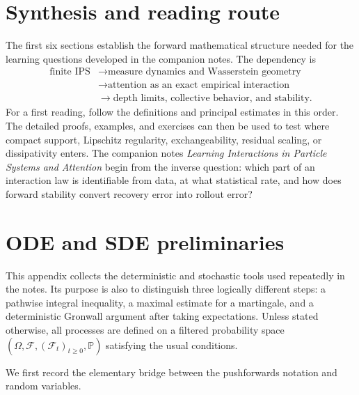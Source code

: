 \documentclass[11pt]{amsart}
\numberwithin{equation}{section}
\theoremstyle{plain}
\newcommand{\Prob}{\mathbb{P}}
\begin{document}
\section*{Synthesis and reading route}
The first six sections establish the forward mathematical structure needed for
the learning questions developed in the companion notes.  The dependency is
\[
\begin{aligned}
 \text{finite IPS}
 &\longrightarrow \text{measure dynamics and Wasserstein geometry}\\
 &\longrightarrow \text{attention as an exact empirical interaction}\\
 &\longrightarrow \text{depth limits, collective behavior, and stability}.
\end{aligned}
\]
For a first reading, follow the definitions and principal estimates in this
order.  The detailed proofs, examples, and exercises can then be used to test
where compact support, Lipschitz regularity, exchangeability, residual
scaling, or dissipativity enters.  The companion notes \emph{Learning
Interactions in Particle Systems and Attention} begin from the inverse
question: which part of an interaction law is identifiable from data, at what
statistical rate, and how does forward stability convert recovery error into
rollout error?

\appendix
\section{ODE and SDE preliminaries}
\label{sec:ode-sde-preliminaries}
This appendix collects the deterministic and stochastic tools used repeatedly
in the notes.  Its purpose is also to distinguish three logically different
steps: a pathwise integral inequality, a maximal estimate for a martingale,
and a deterministic Gronwall argument after taking expectations.  Unless
stated otherwise, all processes are defined on a filtered probability space
$(\Omega,\mathcal F,(\mathcal F_t)_{t\geq0},\Prob)$ satisfying the usual
conditions.

We first record the elementary bridge between the pushforwards notation  and
random variables.
\end{document}
